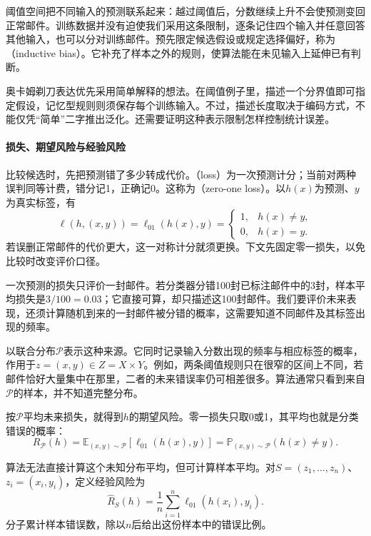 阈值空间把不同输入的预测联系起来：越过阈值后，分数继续上升不会使预测变回正常邮件。训练数据并没有迫使我们采用这条限制，逐条记住四个输入并任意回答其他输入，也可以分对训练邮件。预先限定候选假设或规定选择偏好，称为（inductive bias）。它补充了样本之外的规则，使算法能在未见输入上延伸已有判断。

奥卡姆剃刀表达优先采用简单解释的想法。在阈值例子里，描述一个分界值即可指定假设，记忆型规则则须保存每个训练输入。不过，描述长度取决于编码方式，不能仅凭“简单”二字推出泛化。还需要证明这种表示限制怎样控制统计误差。

\paragraph{损失、期望风险与经验风险}

比较候选时，先把预测错了多少转成代价。（loss）为一次预测计分；当前对两种误判同等计费，错分记1，正确记0。这称为（zero-one loss）。以$h(x)$为预测、$y$为真实标签，有
\begin{equation}
 \ell(h,(x,y))=\ell_{01}(h(x),y)=\begin{cases}
  1,&h(x)\neq y,\\
  0,&h(x)=y.
 \end{cases}
 \label{eq:zero-one-loss}
\end{equation}
若误删正常邮件的代价更大，这一对称计分就须更换。下文先固定零一损失，以免比较时改变评价口径。

一次预测的损失只评价一封邮件。若分类器分错100封已标注邮件中的3封，样本平均损失是$3/100=0.03$；它直接可算，却只描述这100封邮件。我们要评价未来表现，还须计算随机到来的一封邮件被分错的概率，这需要知道不同邮件及其标签出现的频率。

以联合分布$\mathcal P$表示这种来源。它同时记录输入分数出现的频率与相应标签的概率，作用于$z=(x,y)\in Z=X\times Y$。例如，两条阈值规则只在很窄的区间上不同，若邮件恰好大量集中在那里，二者的未来错误率仍可相差很多。算法通常只看到来自$\mathcal P$的样本，并不知道完整分布。

按$\mathcal P$平均未来损失，就得到$h$的期望风险。零一损失只取0或1，其平均也就是分类错误的概率：
\begin{equation}
 R_{\mathcal P}(h)
 =\mathbb E_{(x,y)\sim\mathcal P}[\ell_{01}(h(x),y)]
 =\mathbb P_{(x,y)\sim\mathcal P}(h(x)\neq y).
 \label{eq:population-classification-risk}
\end{equation}

算法无法直接计算这个未知分布平均，但可计算样本平均。对$S=(z_1,\ldots,z_n)$、$z_i=(x_i,y_i)$，定义经验风险为
\begin{equation}
 \hat R_S(h)=\frac1n\sum_{i=1}^n\ell_{01}(h(x_i),y_i).
 \label{eq:empirical-classification-risk}
\end{equation}
分子累计样本错误数，除以$n$后给出这份样本中的错误比例。

